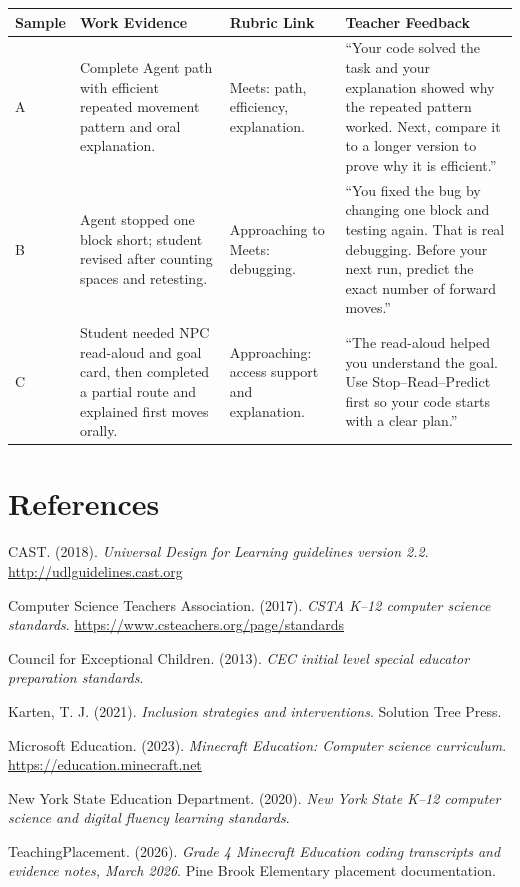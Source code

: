 \documentclass[12pt]{article}
\begin{document}
\begin{xltabular}{\textwidth}{|P{0.5in}|P{2.3in}|P{1.0in}|P{2.5in}|}
\hline
{}\color{white}\bfseries Sample & \color{white}\bfseries Work Evidence & \color{white}\bfseries Rubric Link & \color{white}\bfseries Teacher Feedback \\
\hline
A & Complete Agent path with efficient repeated movement pattern and oral explanation. & Meets: path, efficiency, explanation. & ``Your code solved the task and your explanation showed why the repeated pattern worked. Next, compare it to a longer version to prove why it is efficient.'' \\
\hline
{} B & Agent stopped one block short; student revised after counting spaces and retesting. & Approaching to Meets: debugging. & ``You fixed the bug by changing one block and testing again. That is real debugging. Before your next run, predict the exact number of forward moves.'' \\
\hline
C & Student needed NPC read-aloud and goal card, then completed a partial route and explained first moves orally. & Approaching: access support and explanation. & ``The read-aloud helped you understand the goal. Use Stop--Read--Predict first so your code starts with a clear plan.'' \\
\hline
\end{xltabular}

\section{References}

CAST. (2018). \emph{Universal Design for Learning guidelines version 2.2}. \url{http://udlguidelines.cast.org}

Computer Science Teachers Association. (2017). \emph{CSTA K--12 computer science standards}. \url{https://www.csteachers.org/page/standards}

Council for Exceptional Children. (2013). \emph{CEC initial level special educator preparation standards}.

Karten, T. J. (2021). \emph{Inclusion strategies and interventions}. Solution Tree Press.

Microsoft Education. (2023). \emph{Minecraft Education: Computer science curriculum}. \url{https://education.minecraft.net}

New York State Education Department. (2020). \emph{New York State K--12 computer science and digital fluency learning standards}.

TeachingPlacement. (2026). \emph{Grade 4 Minecraft Education coding transcripts and evidence notes, March 2026}. Pine Brook Elementary placement documentation.
\end{document}
